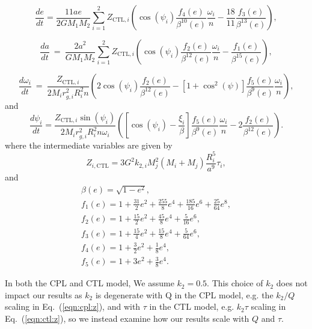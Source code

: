 \documentclass[twocolumn]{aastex61}
\begin{document}
\begin{equation} \label{eqn:ctl:e}
  \frac{de}{dt} = \frac{11 ae}{2 G M_1 M_2}
  \sum_{i = 1}^2 Z_{\mathrm{CTL},i} \left( \cos(\psi_i) \frac{f_4(e)}{\beta^{10}(e)}  \frac{\omega_i}{n} -\frac{18}{11} \frac{f_3(e)}{\beta^{13}(e)}\right),
\end{equation}

\begin{equation}\label{eqn:ctl:a}
  \frac{da}{dt} \ = \  \frac{2 a^2}{G M_1 M_2}
  \sum\limits_{i = 1}^2 Z_{\mathrm{CTL},i} \left( \cos(\psi_i) \frac{f_2(e)}{\beta^{12}(e)} \frac{\omega_i}{n} - \frac{f_1(e)}{\beta^{15}(e)}\right),
\end{equation}

\begin{equation}\label{eqn:ctl:omega}
  \frac{d\omega_i}{dt} \ = \ \frac{Z_{\mathrm{CTL},i}}{2 M_i r_{g,i}^2 
R_i^2 n} \left( 2 \cos(\psi_i) \frac{f_2(e)}{\beta^{12}(e)} - \left[ 1+\cos^2(\psi)
 \right] \frac{f_5(e)}{\beta^9(e)} 
\frac{\omega_i}{n} \right),  
\end{equation}
and
\begin{equation}\label{eqn:ctl:psi}
  \frac{d\psi_i}{dt} = \frac{Z_{\mathrm{CTL},i} \sin(\psi_i)}{2 M_i r_{g,i}^2 R_i^2 n \omega_i}\left( \left[ \cos(\psi_i) - \frac{\xi_i}{ \beta} \right] \frac{f_5(e)}{\beta^9(e)} \frac{\omega_i}{n} - 2 \frac{f_2(e)}{\beta^{12}(e)} \right).
\end{equation}
where the intermediate variables are given by 
\begin{equation}\label{eqn:ctl:z}
 Z_{i,\mathrm{CTL}} = 3 G^2 k_{2,i} M_j^2 (M_i+M_j) \frac{R_i^5}{a^9} \tau_i ,
\end{equation}
and 
\begin{equation}\label{eqn:ctl:f_e}
\begin{array}{l}
\beta(e) = \sqrt{1-e^2},\\
f_1(e) = 1 + \frac{31}{2} e^2 + \frac{255}{8} e^4 + \frac{185}{16} e^6 + \frac{25}{
64} e^8,\\
f_2(e) = 1 + \frac{15}{2} e^2 + \frac{45}{8} e^4 + \frac{5}{16} e^6,\\
f_3(e) = 1 + \frac{15}{4} e^2 + \frac{15}{8} e^4 + \frac{5}{64} e^6,\\
f_4(e) = 1 + \frac{3}{2} e^2 + \frac{1}{8} e^4,\\
f_5(e) = 1 + 3 e^2 + \frac{3}{8} e^4.
\end{array}
\end{equation}

In both the CPL and CTL model, We assume $k_2 = 0.5$. This choice of $k_2$ does not impact our results as $k_2$ is degenerate with Q in the CPL model, e.g. the $k_2/Q$ scaling in Eq.~(\ref{eqn:cpl:z}), and with $\tau$ in the CTL model, e.g. $k_2 \tau$ scaling in Eq.~(\ref{eqn:ctl:z}), so we instead examine how our results scale with $Q$ and $\tau$.
\end{document}
